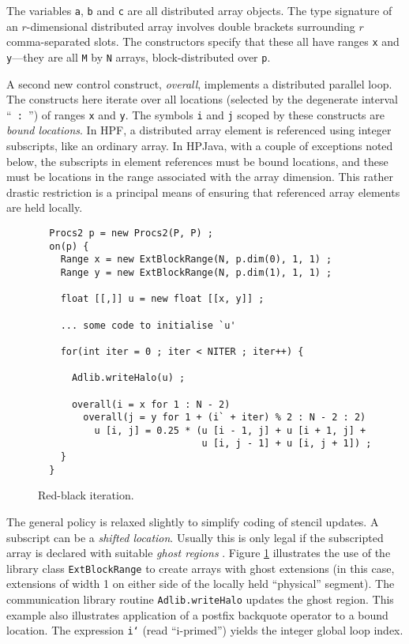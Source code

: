 The variables {\tt a}, {\tt b} and {\tt c} are all distributed array
objects.  The type signature of an $r$-dimensional distributed array
involves double brackets surrounding $r$ comma-separated slots.  The
constructors specify that these all have ranges {\tt x} and {\tt y}---they
are all {\tt M} by {\tt N} arrays, block-distributed over {\tt p}.

A second new control construct, {\em overall}, implements a distributed
parallel loop.  The
constructs here iterate over all locations (selected by the degenerate
interval ``\verb$ : $'') of ranges \verb$x$ and \verb$y$.  The symbols
{\tt i} and {\tt j} scoped by these constructs are {\em bound
locations}.  In HPF, a distributed array element is referenced using
integer subscripts, like an ordinary array.  In HPJava, with a couple
of exceptions noted below, the subscripts in element references must be
bound locations, and these must be locations in the range associated
with the array dimension.  This rather drastic restriction is a
principal means of ensuring that referenced array elements are held
locally.

\begin{figure}[btp]

\small
\begin{verbatim}
  Procs2 p = new Procs2(P, P) ;
  on(p) {
    Range x = new ExtBlockRange(N, p.dim(0), 1, 1) ;
    Range y = new ExtBlockRange(N, p.dim(1), 1, 1) ;

    float [[,]] u = new float [[x, y]] ;

    ... some code to initialise `u'

    for(int iter = 0 ; iter < NITER ; iter++) {

      Adlib.writeHalo(u) ;

      overall(i = x for 1 : N - 2)
        overall(j = y for 1 + (i` + iter) % 2 : N - 2 : 2)
          u [i, j] = 0.25 * (u [i - 1, j] + u [i + 1, j] +
                             u [i, j - 1] + u [i, j + 1]) ;
    }
  }
\end{verbatim}
\normalsize

\caption{\label{fig:redBlack}Red-black iteration.}
\end{figure}

The general policy is relaxed slightly to simplify coding of stencil
updates.  A subscript can be a {\em shifted location}.  Usually
this is only legal if the subscripted array is declared with suitable {\em
ghost regions} \cite{Ghost}.  Figure \ref{fig:redBlack} illustrates the
use of the library class {\tt ExtBlockRange} to create arrays with
ghost extensions (in this case, extensions of width 1 on either side of
the locally held ``physical'' segment).  The communication library
routine {\tt Adlib.writeHalo} updates the ghost region.  This example
also illustrates application of a postfix backquote operator to a bound
location.  The expression {\tt i`} (read ``i-primed'') yields the integer
global loop index.

